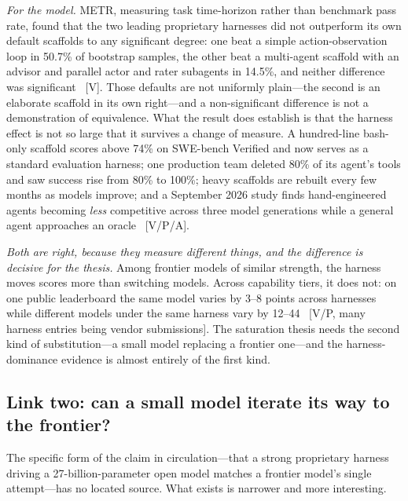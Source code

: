 \emph{For the model.} METR, measuring task time-horizon rather than benchmark pass rate, found that the two leading proprietary harnesses did not outperform its own default scaffolds to any significant degree: one beat a simple action-observation loop in 50.7\% of bootstrap samples, the other beat a multi-agent scaffold with an advisor and parallel actor and rater subagents in 14.5\%, and neither difference was significant~\cite{metr-harness} [V]. Those defaults are not uniformly plain---the second is an elaborate scaffold in its own right---and a non-significant difference is not a demonstration of equivalence. What the result does establish is that the harness effect is not so large that it survives a change of measure. A hundred-line bash-only scaffold scores above 74\% on SWE-bench Verified and now serves as a standard evaluation harness; one production team deleted 80\% of its agent's tools and saw success rise from 80\% to 100\%; heavy scaffolds are rebuilt every few months as models improve; and a September 2026 study finds hand-engineered agents becoming \emph{less} competitive across three model generations while a general agent approaches an oracle~\cite{bitter-lesson-scaffold} [V/P/A].

\emph{Both are right, because they measure different things, and the difference is decisive for the thesis.} Among frontier models of similar strength, the harness moves scores more than switching models. Across capability tiers, it does not: on one public leaderboard the same model varies by 3--8 points across harnesses while different models under the same harness vary by 12--44~\cite{tbench-harness-spread} [V/P, many harness entries being vendor submissions]. The saturation thesis needs the second kind of substitution---a small model replacing a frontier one---and the harness-dominance evidence is almost entirely of the first kind.

\subsection{Link two: can a small model iterate its way to the frontier?}
\label{sec:sat-link2}

The specific form of the claim in circulation---that a strong proprietary harness driving a 27-billion-parameter open model matches a frontier model's single attempt---has no located source. What exists is narrower and more interesting.

